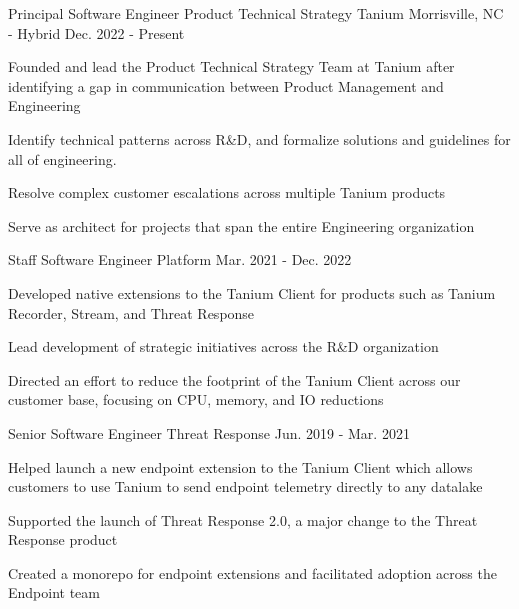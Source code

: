 
  \begin{cventries}

    \cventry
    {Principal Software Engineer {\enskip\textendash\enskip} Product Technical Strategy} %
    {Tanium} %
    {Morrisville, NC - Hybrid} %
    {Dec. 2022 - Present} %
    {
      \begin{cvitems}
        \item Founded and lead the Product Technical Strategy Team at Tanium after identifying a gap in communication between Product Management and Engineering
        \item Identify technical patterns across R\&D, and formalize solutions and guidelines for all of engineering.
        \item Resolve complex customer escalations across multiple Tanium products
        \item Serve as architect for projects that span the entire Engineering organization
      \end{cvitems}
    }

    \cventry
      {Staff Software Engineer \enskip\textendash\enskip Platform} %
      {} %
      {} %
      {Mar. 2021 - Dec. 2022} %
      {
        \begin{cvitems}
          \item Developed native extensions to the Tanium Client for products such as Tanium Recorder, Stream, and Threat Response
          \item Lead development of strategic initiatives across the R\&D organization
          \item Directed an effort to reduce the footprint of the Tanium Client across our customer base, focusing on CPU, memory, and IO reductions
        \end{cvitems}
      }

    \cventry
      {Senior Software Engineer \enskip\textendash\enskip Threat Response} %
      {} %
      {} %
      {Jun. 2019 - Mar. 2021} %
      {
        \begin{cvitems}
          \item Helped launch a new endpoint extension to the Tanium Client which allows customers to use Tanium to send endpoint telemetry directly to any datalake
          \item Supported the launch of Threat Response 2.0, a major change to the Threat Response product
          \item Created a monorepo for endpoint extensions and facilitated adoption across the Endpoint team
        \end{cvitems}
      }


\end{cventries}
